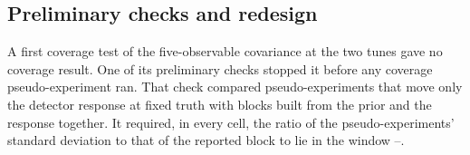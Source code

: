 \subsection{Preliminary checks and redesign}
\label{supp:study-cov1}
A first coverage test of the five-observable covariance at the two tunes gave no coverage result. One of its preliminary checks stopped it before any coverage pseudo-experiment ran. That check compared pseudo-experiments that move only the detector response at fixed truth with blocks built from the prior and the response together. It required, in every cell, the ratio of the pseudo-experiments' standard deviation to that of the reported block to lie in the window --.

